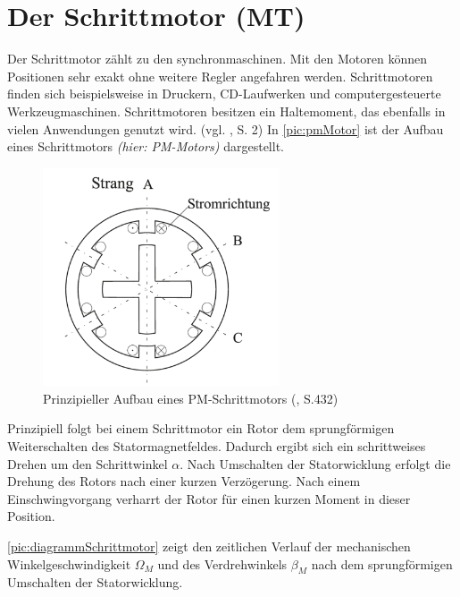 \newpage
\section{Der Schrittmotor (MT)}
\label{sec:schrittmotor}
Der Schrittmotor zählt zu den \acrshort{synchronmaschine}n. Mit den Motoren können Positionen sehr exakt ohne weitere Regler angefahren werden. Schrittmotoren finden sich beispielsweise in Druckern, CD-Laufwerken und computergesteuerte Werkzeugmaschinen.  Schrittmotoren besitzen ein Haltemoment, das ebenfalls in vielen Anwendungen genutzt wird. (vgl. \cite{schrittmotorBa}, S. 2) In \autoref{pic:pmMotor} ist der Aufbau eines Schrittmotors \textit{(hier: PM-Motors)} dargestellt. 

\begin{figure}[h]
	\begin{center}
		\includegraphics[width=7cm]{pmMotor.png}
		\caption{Prinzipieller Aufbau eines PM-Schrittmotors (\cite{kleinantriebe}, S.432)}
		\label{pic:pmMotor}
	\end{center}
\end{figure}


Prinzipiell folgt bei einem Schrittmotor ein Rotor dem sprungförmigen Weiterschalten des Statormagnetfeldes. Dadurch ergibt sich ein schrittweises Drehen um den Schrittwinkel $\alpha$. Nach Umschalten der Statorwicklung erfolgt die Drehung des Rotors nach einer kurzen Verzögerung. Nach einem Einschwingvorgang verharrt der Rotor für einen kurzen Moment in dieser Position. \newpage

 \autoref{pic:diagrammSchrittmotor} zeigt den zeitlichen Verlauf der mechanischen Winkelgeschwindigkeit  $\Omega_M$ und des Verdrehwinkels $\beta_M$ nach dem sprungförmigen Umschalten der Statorwicklung.  

